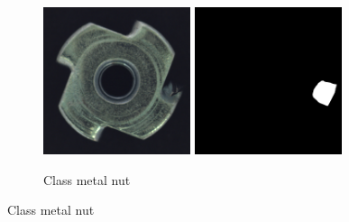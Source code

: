 \begin{figure}[ht]
\begin{subfigure}[b]{0.3\textwidth}
    \end{subfigure}
    \\
    \begin{subfigure}[b]{0.3\textwidth}
        \centering
        \includegraphics[width=0.475\textwidth]{figures/mvtecadexampleimages/metalnut024.png}
        \includegraphics[width=0.475\textwidth]{figures/mvtecadexampleimages/metalnut024_mask.png}
        \caption*{Class metal nut}


\end{subfigure}
\end{figure}
